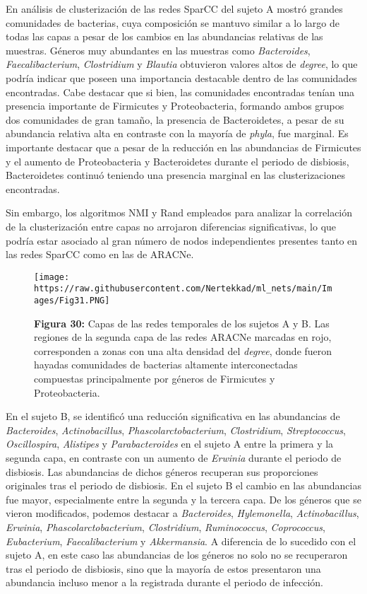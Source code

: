 \documentclass[
]{book}
\begin{document}
En análisis de clusterización de las redes SparCC del sujeto A mostró grandes comunidades de bacterias, cuya composición se mantuvo similar a lo largo de todas las capas a pesar de los cambios en las abundancias relativas de las muestras. Géneros muy abundantes en las muestras como \emph{Bacteroides}, \emph{Faecalibacterium}, \emph{Clostridium} y \emph{Blautia} obtuvieron valores altos de \emph{degree}, lo que podría indicar que poseen una importancia destacable dentro de las comunidades encontradas. Cabe destacar que si bien, las comunidades encontradas tenían una presencia importante de Firmicutes y Proteobacteria, formando ambos grupos dos comunidades de gran tamaño, la presencia de Bacteroidetes, a pesar de su abundancia relativa alta en contraste con la mayoría de \emph{phyla}, fue marginal. Es importante destacar que a pesar de la reducción en las abundancias de Firmicutes y el aumento de Proteobacteria y Bacteroidetes durante el periodo de disbiosis, Bacteroidetes continuó teniendo una presencia marginal en las clusterizaciones encontradas.

Sin embargo, los algoritmos NMI y Rand empleados para analizar la correlación de la clusterización entre capas no arrojaron diferencias significativas, lo que podría estar asociado al gran número de nodos independientes presentes tanto en las redes SparCC como en las de ARACNe.

\begin{figure}
\centering
\texttt{[image: https://raw.githubusercontent.com/Nertekkad/ml\_nets/main/Images/Fig31.PNG]}
\caption{\textbf{Figura 30:} Capas de las redes temporales de los sujetos A y B. Las regiones de la segunda capa de las redes ARACNe marcadas en rojo, corresponden a zonas con una alta densidad del \emph{degree}, donde fueron hayadas comunidades de bacterias altamente interconectadas compuestas principalmente por géneros de Firmicutes y Proteobacteria.}
\end{figure}

En el sujeto B, se identificó una reducción significativa en las abundancias de \emph{Bacteroides}, \emph{Actinobacillus}, \emph{Phascolarctobacterium}, \emph{Clostridium}, \emph{Streptococcus}, \emph{Oscillospira}, \emph{Alistipes} y \emph{Parabacteroides} en el sujeto A entre la primera y la segunda capa, en contraste con un aumento de \emph{Erwinia} durante el periodo de disbiosis. Las abundancias de dichos géneros recuperan sus proporciones originales tras el periodo de disbiosis. En el sujeto B el cambio en las abundancias fue mayor, especialmente entre la segunda y la tercera capa. De los géneros que se vieron modificados, podemos destacar a \emph{Bacteroides}, \emph{Hylemonella}, \emph{Actinobacillus}, \emph{Erwinia}, \emph{Phascolarctobacterium}, \emph{Clostridium}, \emph{Ruminococcus}, \emph{Coprococcus}, \emph{Eubacterium}, \emph{Faecalibacterium} y \emph{Akkermansia}. A diferencia de lo sucedido con el sujeto A, en este caso las abundancias de los géneros no solo no se recuperaron tras el periodo de disbiosis, sino que la mayoría de estos presentaron una abundancia incluso menor a la registrada durante el periodo de infección.
\end{document}

